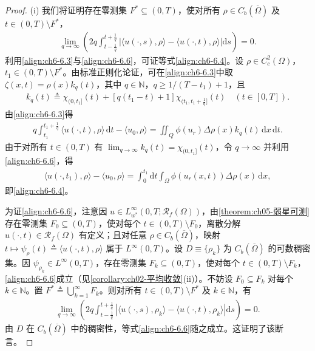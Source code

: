 \documentclass[../../main.tex]{subfiles}%
\begin{document}
\begin{proof}
(i) 我们将证明存在零测集 $F^*\subseteq(0,T)$，使对所有 $\rho\in C_b(\overline\Omega)$ 及 $t\in(0,T)\setminus F^*$，
\begin{align}
\lim_{q\to\infty}\left(2q\int_{t-\frac{1}{q}}^{t+\frac{1}{q}}
\left|\langle u(\cdot,s),\rho\rangle-\langle u(\cdot,t),\rho\rangle\right|\mathrm{d}s\right)=0. \label{align:ch6-6.6}
\end{align}
利用\eqref{align:ch6-6.3}与\eqref{align:ch6-6.6}，可证等式\eqref{align:ch6-6.4}。设 $\rho\in C^2_c(\Omega)$，$t_1\in(0,T)\setminus F^*$。由标准正则化论证，可在\eqref{align:ch6-6.3}中取 $\zeta(x,t)=\rho(x)k_q(t)$，其中 $q\in\mathbb{N}$，$q\geqslant1/(T-t_1)+1$，且
\begin{align}
k_q(t)\triangleq \chi_{(0,t_1]}(t)+[q(t_1-t)+1]\chi_{(t_1,t_1+\frac{1}{q}]}(t) \quad(t\in[0,T]). \label{align:ch6-6.7}
\end{align}
由\eqref{align:ch6-6.3}得
\begin{align*}
q\int_{t_1}^{t_1+\frac{1}{q}}\langle u(\cdot,t),\rho\rangle\,\mathrm{d}t-\langle u_0,\rho\rangle
= \iint_Q\phi(u_r)\Delta\rho(x)k_q(t)\,\mathrm{d}x\,\mathrm{d}t.
\end{align*}
由于对所有 $t\in(0,T)$ 有 $\lim_{q\to\infty}k_q(t)=\chi_{(0,t_1]}(t)$，令 $q\to\infty$ 并利用\eqref{align:ch6-6.6}，得
\begin{align*}
\langle u(\cdot,t_1),\rho\rangle-\langle u_0,\rho\rangle
= \int_0^{t_1}\mathrm{d}t\int_\Omega\phi(u_r(x,t))\Delta\rho(x)\,\mathrm{d}x,
\end{align*}
即\eqref{align:ch6-6.4}。

为证\eqref{align:ch6-6.6}，注意因 $u\in L^\infty_{w^*}(0,T;\mathscr{R}_f(\Omega))$，由\cref{theorem:ch05-弱星可测}存在零测集 $F_0\subseteq(0,T)$，使对每个 $t\in(0,T)\setminus F_0$，离散分解 $u(\cdot,t)\in\mathscr{R}_f(\Omega)$ 有定义；且对任意 $\rho\in C_b(\overline\Omega)$，映射 $t\mapsto\psi_\rho(t)\triangleq \langle u(\cdot,t),\rho\rangle$ 属于 $L^\infty(0,T)$。设 $D\equiv\{\rho_k\}$ 为 $C_b(\overline\Omega)$ 的可数稠密集。因 $\psi_{\rho_k}\in L^\infty(0,T)$，存在零测集 $F_k\subseteq(0,T)$，使对每个 $t\in(0,T)\setminus F_k$，\eqref{align:ch6-6.6}成立（见\cref{corollary:ch02-平均收敛}(ii)）。不妨设 $F_0\subseteq F_k$ 对每个 $k\in\mathbb{N}$。置 $F^*\triangleq \bigcup_{k=1}^\infty F_k$。则对所有 $t\in(0,T)\setminus F^*$ 及 $k\in\mathbb{N}$，有
\begin{align*}
\lim_{q\to\infty}\left(2q\int_{t-\frac{1}{q}}^{t+\frac{1}{q}}
\left|\langle u(\cdot,s),\rho_k\rangle-\langle u(\cdot,t),\rho_k\rangle\right|\mathrm{d}s\right)=0.
\end{align*}
由 $D$ 在 $C_b(\overline\Omega)$ 中的稠密性，等式\eqref{align:ch6-6.6}随之成立。这证明了该断言。


\end{proof}
\end{document}
